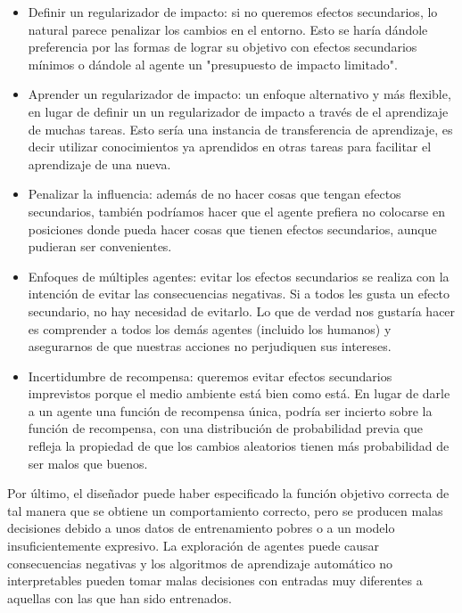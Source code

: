 \documentclass[12pt,a4paper]{article}
\begin{document}
\begin{itemize}
\item Definir un regularizador de impacto: si no queremos efectos secundarios, lo natural parece penalizar los cambios en el entorno. Esto se haría dándole preferencia por las formas de lograr su objetivo con efectos secundarios mínimos o dándole al agente un "presupuesto de impacto limitado".

\item Aprender un regularizador de impacto: un enfoque alternativo y más flexible, en lugar de definir un un regularizador de impacto a través de el aprendizaje de muchas tareas. Esto sería una instancia de transferencia de aprendizaje, es decir utilizar conocimientos ya aprendidos en otras tareas para facilitar el aprendizaje de una nueva.

\item Penalizar la influencia: además de no hacer cosas que tengan efectos secundarios, también podríamos hacer que el agente prefiera no colocarse en posiciones donde pueda hacer cosas que tienen efectos secundarios, aunque pudieran ser convenientes.

\item Enfoques de múltiples agentes: evitar los efectos secundarios se realiza con la intención de evitar las consecuencias negativas. Si a todos les gusta un efecto secundario, no hay necesidad de evitarlo. Lo que de verdad nos gustaría hacer es comprender a todos los demás agentes (incluido los humanos) y asegurarnos de que nuestras acciones no perjudiquen sus intereses.

\item Incertidumbre de recompensa: queremos evitar efectos secundarios imprevistos porque el medio ambiente está bien como está. En lugar de darle a un agente una función de recompensa única, podría ser incierto sobre la función de recompensa, con una distribución de probabilidad previa que refleja la propiedad de que los cambios aleatorios tienen más probabilidad de ser malos que buenos.
\end{itemize}

Por último, el diseñador puede haber especificado la función objetivo correcta de tal manera que se obtiene un comportamiento correcto, pero se producen malas decisiones debido a unos datos de entrenamiento pobres o a un modelo insuficientemente expresivo. La exploración de agentes puede causar consecuencias negativas y los algoritmos de aprendizaje automático no interpretables pueden tomar malas decisiones con entradas muy diferentes a aquellas con las que han sido entrenados.
\end{document}
